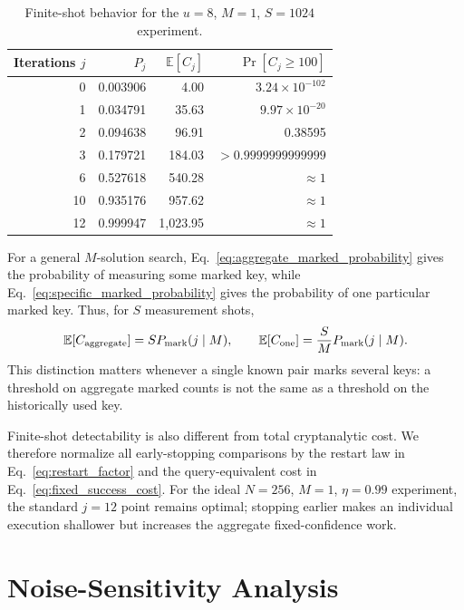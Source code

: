 \documentclass[pdflatex,sn-nature]{sn-jnl}
\newcommand{\E}{\mathbb{E}}
\theoremstyle{thmstyleone}
\theoremstyle{thmstyletwo}
\begin{document}
\begin{table}[htbp]
\centering
\caption{Finite-shot behavior for the $u=8$, $M=1$, $S=1024$ experiment.}
\label{tab:finite}
\begin{tabular}{rrrr}
\toprule
Iterations $j$ & $P_j$ & $\E[C_j]$ & $\Pr[C_j\ge100]$\\
\midrule
0 & 0.003906 & 4.00 & $3.24\times10^{-102}$\\
1 & 0.034791 & 35.63 & $9.97\times10^{-20}$\\
2 & 0.094638 & 96.91 & 0.38595\\
3 & 0.179721 & 184.03 & $>0.9999999999999$\\
6 & 0.527618 & 540.28 & $\approx1$\\
10 & 0.935176 & 957.62 & $\approx1$\\
12 & 0.999947 & 1,023.95 & $\approx1$\\
\bottomrule
\end{tabular}
\end{table}

For a general $M$-solution search, Eq.~\eqref{eq:aggregate_marked_probability} gives the probability of measuring some marked key, while Eq.~\eqref{eq:specific_marked_probability} gives the probability of one particular marked key.  Thus, for $S$ measurement shots,
\begin{equation}
    \E[C_{\rm aggregate}]=S P_{\rm mark}(j\mid M),
    \qquad
    \E[C_{\rm one}]=\frac{S}{M}P_{\rm mark}(j\mid M).
\end{equation}
This distinction matters whenever a single known pair marks several keys: a threshold on aggregate marked counts is not the same as a threshold on the historically used key.

Finite-shot detectability is also different from total cryptanalytic cost.  We therefore normalize all early-stopping comparisons by the restart law in Eq.~\eqref{eq:restart_factor} and the query-equivalent cost in Eq.~\eqref{eq:fixed_success_cost}.  For the ideal $N=256$, $M=1$, $\eta=0.99$ experiment, the standard $j=12$ point remains optimal; stopping earlier makes an individual execution shallower but increases the aggregate fixed-confidence work.

\section{Noise-Sensitivity Analysis}
\end{document}
